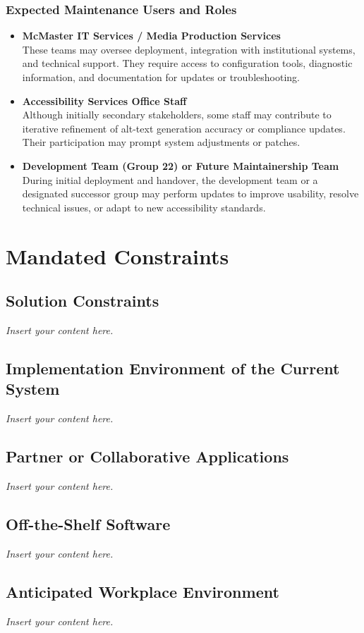\documentclass[12pt]{article}
\newcommand{\lips}{\textit{Insert your content here.}}
\begin{document}
\subsubsection*{Expected Maintenance Users and Roles}
\begin{itemize}
  \item \textbf{McMaster IT Services / Media Production Services} \\
    These teams may oversee deployment, integration with
    institutional systems, and technical support. They require access
    to configuration tools, diagnostic information, and documentation
    for updates or troubleshooting.
  \item \textbf{Accessibility Services Office Staff} \\
    Although initially secondary stakeholders, some staff may
    contribute to iterative refinement of alt-text generation
    accuracy or compliance updates. Their participation may prompt
    system adjustments or patches.
  \item \textbf{Development Team (Group 22) or Future Maintainership Team} \\
    During initial deployment and handover, the development team or a
    designated successor group may perform updates to improve
    usability, resolve technical issues, or adapt to new
    accessibility standards.
\end{itemize}

\section{Mandated Constraints}
\subsection{Solution Constraints}
\lips
\subsection{Implementation Environment of the Current System}
\lips
\subsection{Partner or Collaborative Applications}
\lips
\subsection{Off-the-Shelf Software}
\lips
\subsection{Anticipated Workplace Environment}
\lips
\end{document}
